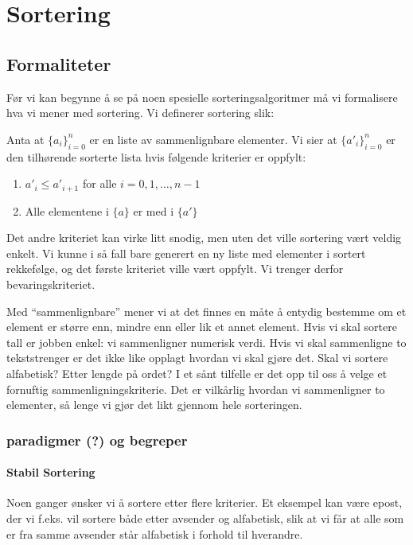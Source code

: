\section{\color{red}Sortering}
\subsection{Formaliteter}
\label{sort_form}
Før vi kan begynne å se på noen spesielle sorteringsalgoritmer må vi formalisere hva vi mener med sortering. Vi definerer sortering slik:

\begin{definisjon}
Anta at $ {\{a_i\}}_{i=0}^n $ er en liste av sammenlignbare elementer. Vi sier at $ {\{a'_i\}}_{i=0}^n $ er den tilhørende sorterte lista hvis følgende kriterier er oppfylt:
\begin{enumerate}[i]
\item $ a'_i \leq a'_{i+1} $ for alle $ i = 0, 1, \ldots, n-1 $
\item Alle elementene i $ \{a\} $ er med i $ \{a'\} $
\end{enumerate}
\end{definisjon}

Det andre kriteriet kan virke litt snodig, men uten det ville sortering vært veldig enkelt. Vi kunne i så fall bare generert en ny liste med elementer i sortert rekkefølge, og det første kriteriet ville vært oppfylt. Vi trenger derfor bevaringskriteriet. 

Med ``sammenlignbare'' mener vi at det finnes en måte å entydig bestemme om et element er større enn, mindre enn eller lik et annet element. Hvis vi skal sortere tall er jobben enkel: vi sammenligner numerisk verdi. Hvis vi skal sammenligne to tekststrenger er det ikke like opplagt hvordan vi skal gjøre det. Skal vi sortere alfabetisk? Etter lengde på ordet? I et sånt tilfelle er det opp til oss å velge et fornuftig sammenligningskriterie. Det er vilkårlig hvordan vi sammenligner to elementer, så lenge vi gjør det likt gjennom hele sorteringen. 

\subsubsection{\color{red}paradigmer (?) og begreper}
\label{sec:sortbegrep}

\paragraph{\color{red}Stabil Sortering}\label{stabil}
Noen ganger ønsker vi å sortere etter flere kriterier. Et eksempel kan være
epost, der vi f.eks. vil sortere både etter avsender og alfabetisk, slik at vi
får at alle som er fra samme avsender står alfabetisk i forhold til hverandre.

